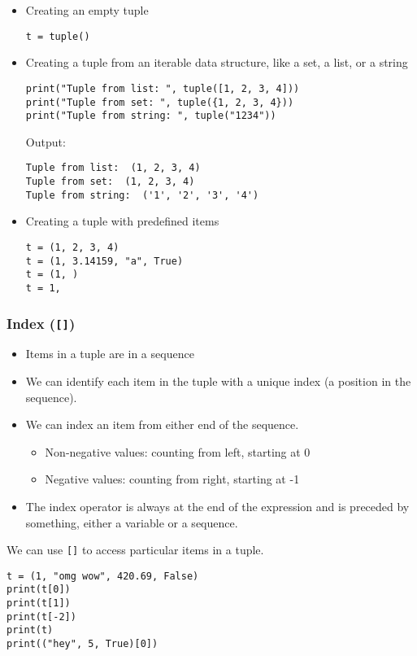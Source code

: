 \documentclass[11pt]{article}
\begin{document}
\begin{itemize}
\item Creating an empty tuple
\begin{verbatim}
t = tuple()
\end{verbatim}

\item Creating a tuple from an iterable data structure, like a set, a list, or a string

\begin{verbatim}
print("Tuple from list: ", tuple([1, 2, 3, 4]))
print("Tuple from set: ", tuple({1, 2, 3, 4}))
print("Tuple from string: ", tuple("1234"))
\end{verbatim}

 \noindent Output:

\label{orgaefcc4e}
\begin{verbatim}
Tuple from list:  (1, 2, 3, 4)
Tuple from set:  (1, 2, 3, 4)
Tuple from string:  ('1', '2', '3', '4')
\end{verbatim}

\item Creating a tuple with predefined items
\begin{verbatim}
t = (1, 2, 3, 4)
t = (1, 3.14159, "a", True)
t = (1, )
t = 1,
\end{verbatim}
\end{itemize}
\subsubsection{Index (\texttt{[]})}
\label{sec:orgbea9cd5}
\begin{itemize}
\item Items in a tuple are in a sequence
\item We can identify each item in the tuple with a unique index (a position in the sequence).
\item We can index an item from either end of the sequence.
\begin{itemize}
\item Non-negative values: counting from left, starting at 0
\item Negative values: counting from right, starting at -1
\end{itemize}
\item The index operator is always at the end of the expression and is preceded by something, either a variable or a sequence.
\end{itemize}

We can use \texttt{[]} to access particular items in a tuple.
\begin{verbatim}
t = (1, "omg wow", 420.69, False)
print(t[0])
print(t[1])
print(t[-2])
print(t)
print(("hey", 5, True)[0])
\end{verbatim}
\end{document}
